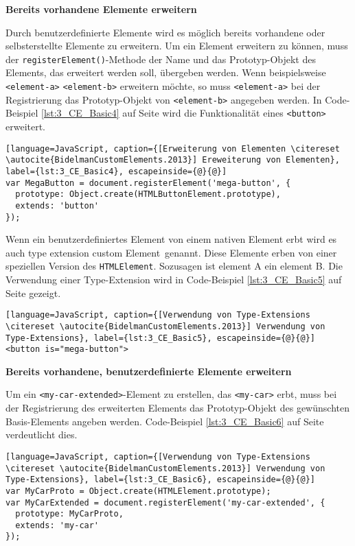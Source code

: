 \textbf{Bereits vorhandene Elemente erweitern}

Durch benutzerdefinierte Elemente wird es möglich bereits vorhandene oder selbsterstellte Elemente zu erweitern. Um ein Element erweitern zu können, muss der \lstinline|registerElement()|-Methode der Name und das Prototyp-Objekt des Elements, das erweitert werden soll, übergeben werden. Wenn beispielsweise \lstinline|<element-a>| \lstinline|<element-b>| erweitern möchte, so muss \lstinline|<element-a>| bei der Registrierung das Prototyp-Objekt von \lstinline|<element-b>| angegeben werden. In Code-Beispiel \ref{lst:3_CE_Basic4} auf Seite \pageref{lst:3_CE_Basic4} wird die Funktionalität eines \lstinline|<button>| erweitert.

\begin{lstlisting}[language=JavaScript, caption={[Erweiterung von Elementen \citereset \autocite{BidelmanCustomElements.2013}] Ereweiterung von Elementen}, label={lst:3_CE_Basic4}, escapeinside={@}{@}]
var MegaButton = document.registerElement('mega-button', {
  prototype: Object.create(HTMLButtonElement.prototype),
  extends: 'button'
});
\end{lstlisting}

Wenn ein benutzerdefiniertes Element von einem nativen Element erbt wird es auch \glqq type extension custom Element\grqq\ genannt. Diese Elemente erben von einer speziellen Version des \lstinline|HTMLElement|. Sozusagen \glqq ist element A ein element B\grqq . Die Verwendung einer Type-Extension wird in Code-Beispiel \ref{lst:3_CE_Basic5} auf Seite \pageref{lst:3_CE_Basic5} gezeigt.

\begin{lstlisting}[language=JavaScript, caption={[Verwendung von Type-Extensions \citereset \autocite{BidelmanCustomElements.2013}] Verwendung von Type-Extensions}, label={lst:3_CE_Basic5}, escapeinside={@}{@}]
<button is="mega-button">
\end{lstlisting}

\textbf{Bereits vorhandene, benutzerdefinierte Elemente erweitern}

Um ein \lstinline|<my-car-extended>|-Element zu erstellen, das \lstinline|<my-car>| erbt, muss bei der Registrierung des erweiterten Elements das Prototyp-Objekt des gewünschten \glqq Basis\grqq -Elements angeben werden. Code-Beispiel \ref{lst:3_CE_Basic6} auf Seite \pageref{lst:3_CE_Basic6} verdeutlicht dies.

\begin{lstlisting}[language=JavaScript, caption={[Verwendung von Type-Extensions \citereset \autocite{BidelmanCustomElements.2013}] Verwendung von Type-Extensions}, label={lst:3_CE_Basic6}, escapeinside={@}{@}]
var MyCarProto = Object.create(HTMLElement.prototype);
var MyCarExtended = document.registerElement('my-car-extended', {
  prototype: MyCarProto,
  extends: 'my-car'
});
\end{lstlisting}


